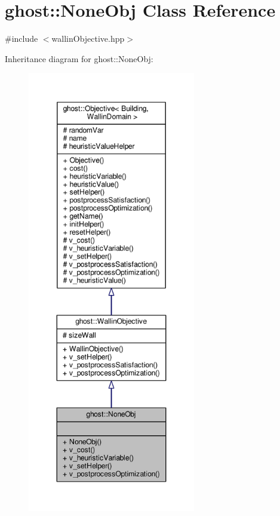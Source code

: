 \hypertarget{classghost_1_1NoneObj}{\section{ghost\-:\-:None\-Obj Class Reference}
\label{classghost_1_1NoneObj}
}


{\ttfamily \#include $<$wallin\-Objective.\-hpp$>$}



Inheritance diagram for ghost\-:\-:None\-Obj\-:
\nopagebreak
\begin{figure}[H]
\begin{center}
\leavevmode
\includegraphics[height=550pt]{classghost_1_1NoneObj__inherit__graph}
\end{center}
\end{figure}



